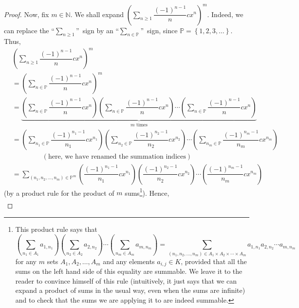 \begin{proof}
Now, fix $m\in\mathbb{N}$. We shall expand $\left(  \sum_{n\geq1}%
\dfrac{\left(  -1\right)  ^{n-1}}{n}cx^{n}\right)  ^{m}$. Indeed, we can
replace the \textquotedblleft$\sum_{n\geq1}$\textquotedblright\ sign by an
\textquotedblleft$\sum_{n\in\mathbb{P}}$\textquotedblright\ sign, since
$\mathbb{P}=\left\{  1,2,3,\ldots\right\}  $. Thus,%
\begin{align*}
&  \left(  \sum_{n\geq1}\dfrac{\left(  -1\right)  ^{n-1}}{n}cx^{n}\right)
^{m}\\
&  =\left(  \sum_{n\in\mathbb{P}}\dfrac{\left(  -1\right)  ^{n-1}}{n}%
cx^{n}\right)  ^{m}\\
&  =\underbrace{\left(  \sum_{n\in\mathbb{P}}\dfrac{\left(  -1\right)  ^{n-1}%
}{n}cx^{n}\right)  \left(  \sum_{n\in\mathbb{P}}\dfrac{\left(  -1\right)
^{n-1}}{n}cx^{n}\right)  \cdots\left(  \sum_{n\in\mathbb{P}}\dfrac{\left(
-1\right)  ^{n-1}}{n}cx^{n}\right)  }_{m\text{ times}}\\
&  =\left(  \sum_{n_{1}\in\mathbb{P}}\dfrac{\left(  -1\right)  ^{n_{1}-1}%
}{n_{1}}cx^{n_{1}}\right)  \left(  \sum_{n_{2}\in\mathbb{P}}\dfrac{\left(
-1\right)  ^{n_{2}-1}}{n_{2}}cx^{n_{2}}\right)  \cdots\left(  \sum_{n_{m}%
\in\mathbb{P}}\dfrac{\left(  -1\right)  ^{n_{m}-1}}{n_{m}}cx^{n_{m}}\right) \\
&  \ \ \ \ \ \ \ \ \ \ \ \ \ \ \ \ \ \ \ \ \left(  \text{here, we have renamed
the summation indices}\right) \\
&  =\sum_{\left(  n_{1},n_{2},\ldots,n_{m}\right)  \in\mathbb{P}^{m}}\left(
\dfrac{\left(  -1\right)  ^{n_{1}-1}}{n_{1}}cx^{n_{1}}\right)  \left(
\dfrac{\left(  -1\right)  ^{n_{2}-1}}{n_{2}}cx^{n_{2}}\right)  \cdots\left(
\dfrac{\left(  -1\right)  ^{n_{m}-1}}{n_{m}}cx^{n_{m}}\right)
\end{align*}
(by a product rule for the product of $m$ sums\footnote{This product rule says
that
\[
\left(  \sum_{n_{1}\in A_{1}}a_{1,n_{1}}\right)  \left(  \sum_{n_{2}\in A_{2}%
}a_{2,n_{2}}\right)  \cdots\left(  \sum_{n_{m}\in A_{m}}a_{m,n_{m}}\right)
=\sum_{\left(  n_{1},n_{2},\ldots,n_{m}\right)  \in A_{1}\times A_{2}%
\times\cdots\times A_{m}}a_{1,n_{1}}a_{2,n_{2}}\cdots a_{m,n_{m}}%
\]
for any $m$ sets $A_{1},A_{2},\ldots,A_{m}$ and any elements $a_{i,j}\in K$,
provided that all the sums on the left hand side of this equality are
summable. We leave it to the reader to convince himself of this rule
(intuitively, it just says that we can expand a product of sums in the usual
way, even when the sums are infinite) and to check that the sums we are
applying it to are indeed summable.}). Hence,%
\begin{align}

\end{align}
\end{proof}
